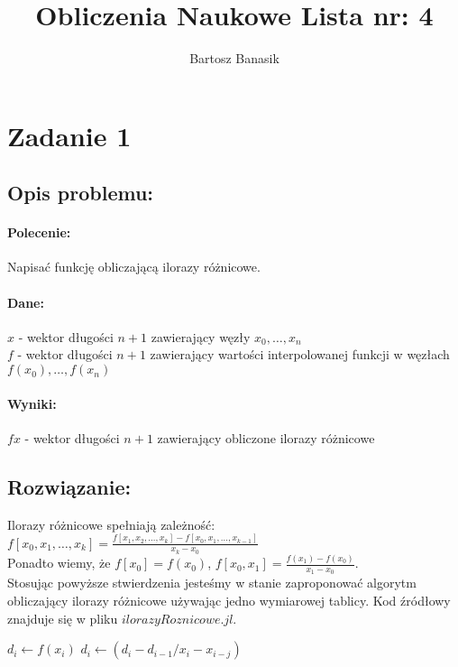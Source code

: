 \documentclass{article}
\begin{document}
	\title{Obliczenia Naukowe Lista nr: 4}
	\author{Bartosz Banasik}
	\maketitle
	
	\newpage
	\section{Zadanie 1}
	\subsection{Opis problemu:}
	\paragraph{Polecenie:}
	Napisać funkcję obliczającą ilorazy różnicowe.
	\paragraph{Dane:}
\indent	$x$ - wektor długości $n+1$  zawierający węzły $x_0, \ldots, x_n$\\
\indent	$f$ - wektor długości $n+1$ zawierający wartości interpolowanej funkcji w węzłach $f(x_0),\ldots,f(x_n) $
	\paragraph{Wyniki:}
\indent	$fx$ - wektor długości $n+1$ zawierający obliczone ilorazy różnicowe
	\subsection{Rozwiązanie:}
    Ilorazy różnicowe spełniają zależność: $f[x_0, x_1, \ldots,x_k]= \frac{f[x_1,x_2,\ldots,x_k] - f[x_0,x_1,\ldots,x_{k-1}]}{x_k - x_0}$\\
    Ponadto wiemy, że $f[x_0] = f(x_0)$, $f[x_0,x_1] = \frac{f(x_1)-f(x_0)}{x_1-x_0}$.\\
  Stosując powyższe stwierdzenia jesteśmy w stanie zaproponować algorytm obliczający ilorazy różnicowe używając jedno wymiarowej tablicy. Kod źródłowy znajduje się w pliku $ilorazyRoznicowe.jl$. 
  \begin{algorithm}[h!]
  	\caption{$ilorazyRoznicowe(x, f)$}
  	\begin{algorithmic}  	
  		\STATE $d_i \leftarrow f(x_i)$
  		\ENDFOR  		
  		\STATE $d_i\leftarrow (d_i - d_{i-1}/x_i-x_{i-j})$
  		\ENDFOR
  		\ENDFOR  		
  	\end{algorithmic}
  \end{algorithm}
\end{document}
